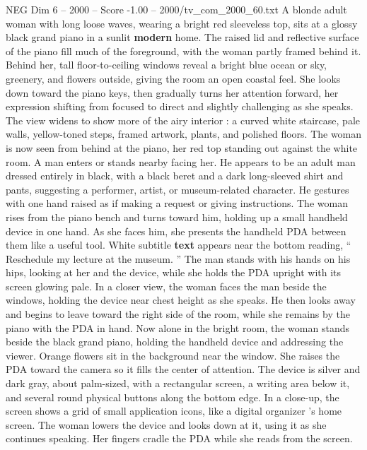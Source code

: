 \begin{textsample}{NEG Dim 6 – 2000 – Score -1.00 – 2000/tv\_com\_2000\_60.txt}  \label{ex:f6_neg_047}
A blonde adult woman with long loose waves, wearing a bright red sleeveless top, sits at a glossy black grand piano in a sunlit \textbf{modern} home.
The raised lid and reflective surface of the piano fill much of the foreground, with the woman partly framed behind it.
Behind her, tall floor-to-ceiling windows reveal a bright blue ocean or sky, greenery, and flowers outside, giving the room an open coastal feel.
She looks down toward the piano keys, then gradually turns her attention forward, her expression shifting from focused to direct and slightly challenging as she speaks.
The view widens to show more of the airy interior : a curved white staircase, pale walls, yellow-toned steps, framed artwork, plants, and polished floors.
The woman is now seen from behind at the piano, her red top standing out against the white room.
A man enters or stands nearby facing her.
He appears to be an adult man dressed entirely in black, with a black beret and a dark long-sleeved shirt and pants, suggesting a performer, artist, or museum-related character.
He gestures with one hand raised as if making a request or giving instructions.
The woman rises from the piano bench and turns toward him, holding up a small handheld device in one hand.
As she faces him, she presents the handheld PDA between them like a useful tool.
White subtitle \textbf{text} appears near the bottom reading, “ Reschedule my lecture at the museum. ” The man stands with his hands on his hips, looking at her and the device, while she holds the PDA upright with its screen glowing pale.
In a closer view, the woman faces the man beside the windows, holding the device near chest height as she speaks.
He then looks away and begins to leave toward the right side of the room, while she remains by the piano with the PDA in hand.
Now alone in the bright room, the woman stands beside the black grand piano, holding the handheld device and addressing the viewer.
Orange flowers sit in the background near the window.
She raises the PDA toward the camera so it fills the center of attention.
The device is silver and dark gray, about palm-sized, with a rectangular screen, a writing area below it, and several round physical buttons along the bottom edge.
In a close-up, the screen shows a grid of small application icons, like a digital organizer ’s home screen.
The woman lowers the device and looks down at it, using it as she continues speaking.
Her fingers cradle the PDA while she reads from the screen.

\end{textsample}
